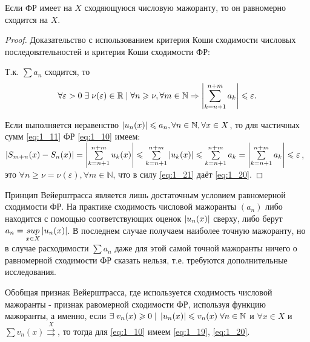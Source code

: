 \begin{theorem} Если ФР имеет на $X$ сходяющуюся числовую мажоранту, то он равномерно сходится на $X$.
\end{theorem}
\begin{proof}
	Доказательство с использованием критерия Коши сходимости числовых последовательностей и критерия Коши сходимости ФР:

	Т.к. $\sum a_n$ сходится, то
	\begin{equation}
	\label{eq:1_23}
	\forall \varepsilon > 0 \; \exists \; \nu(\varepsilon) \in \mathbb{R} \; | \; \forall	n \geqslant \nu, \forall 	m \in \mathbb{N} \Rightarrow \left\lvert \sum_{k = n+1}^{n+m} a_k \right\rvert \leqslant \varepsilon.
	\end{equation}

	Если выполняется неравенство $\left\lvert u_n(x) \right\rvert \leqslant a_n, \forall n \in \mathbb{N}, \forall x \in X$, то для частичных сумм \eqref{eq:1_11} ФР \eqref{eq:1_10} имеем: $\left\lvert S_{m+n} (x) - S_n (x) \right\rvert = \left\lvert \sum\limits_{k = n+1}^{n+m} u_k(x) \right\rvert \leqslant \sum\limits_{k = n + 1}^{n+m} \left\lvert u_k (x) \right\rvert \leqslant \sum\limits_{k = n+1}^{n+m} a_k = \left\lvert \sum\limits_{k = n+1}^{n+m} a_k \right\rvert \leqslant \varepsilon$, это $\forall n \geqslant \nu = \nu(\varepsilon), \forall m \in \mathbb{N}$, что в силу \eqref{eq:1_21} даёт \eqref{eq:1_20}.
\end{proof}

\begin{notes}
	\item Принцип Вейерштрасса является лишь достаточным условием равномерной сходимости ФР. На практике сходимость числовой мажоранты $\left( a_n \right)$ либо находится с помощью соответствующих оценок $\left\lvert u_n(x) \right\rvert$ сверху, либо берут $a_n = \underset{x \in X}{sup} \left\lvert u_n(x) \right\rvert$. В последнем случае получаем наиболее точную мажоранту, но в случае расходимости $\sum a_n$ даже для этой самой точной мажоранты ничего о равномерной сходимости ФР сказать нельзя, т.е. требуются дополнительные исследования.
	\item Обобщая признак Вейерштрасса, где используется сходимость числовой мажоранты - признак равомерной сходимости ФР, используя функцию мажоранты, а именно, если $\exists \; v_n(x) \geqslant 0 \; | \; \left\lvert u_n(x) \right\rvert \leqslant v_n(x) \; \forall n \in \mathbb{N} $ и $ 	\forall x \in X$ и $\sum v_n(x)	 \overset{X}{\rightrightarrows}$, то тогда для \eqref{eq:1_10} имеем \eqref{eq:1_19}, \eqref{eq:1_20}.
\end{notes}
